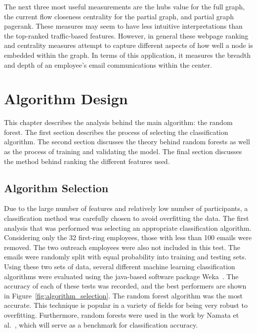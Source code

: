 \documentclass[12pt]{report}
\begin{document}
The next three most useful measurements are the hubs value for the full graph, the current flow closeness centrality for the partial graph, and partial graph pagerank.
These measures may seem to have less intuitive interpretations than the top-ranked traffic-based features.
However, in general these webpage ranking and centrality measures attempt to capture different aspects of how well a node is embedded within the graph.
In terms of this application, it measures the breadth and depth of an employee's email communications within the center.

\chapter{Algorithm Design} \label{Algorithm}
This chapter describes the analysis behind the main algorithm: the random forest.
The first section describes the process of selecting the classification algorithm.
The second section discusses the theory behind random forests as well as the process of training and validating the model.
The final section discusses the method behind ranking the different features used.

\section{Algorithm Selection}
Due to the large number of features and relatively low number of participants, a classification method was carefully chosen to avoid overfitting the data.
The first analysis that was performed was selecting an appropriate classification algorithm.
Considering only the 32 first-ring employees, those with less than 100 emails were removed.
The two outreach employees were also not included in this test.
The emails were randomly split with equal probability into training and testing sets.
Using these two sets of data, several different machine learning classification algorithms were evaluated using the java-based software package Weka~\cite{hall2009weka}.
The accuracy of each of these tests was recorded, and the best performers are shown in Figure~\ref{fig:algorithm_selection}.
The random forest algorithm was the most accurate.
This technique is popular in a variety of fields for being very robust to overfitting.
Furthermore, random forests were used in the work by Namata et al.~\cite{namata_inferring_2006}, which will serve as a benchmark for classification accuracy.
\end{document}
